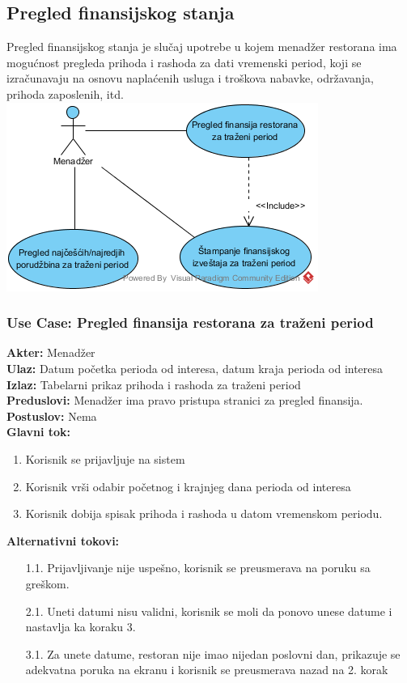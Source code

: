 \documentclass{article}
\begin{document}
\subsection{Pregled finansijskog stanja}
Pregled finansijskog stanja je slučaj upotrebe u kojem menadžer restorana ima mogućnost pregleda prihoda i rashoda za dati vremenski period, koji se izračunavaju na osnovu naplaćenih usluga i troškova nabavke, održavanja, prihoda zaposlenih, itd.
\\
\includegraphics[width=\linewidth]{SU_3_pregled_finansija.png}

\subsubsection{\textbf{Use Case}: Pregled finansija restorana za traženi period}
\textbf{Akter:} Menadžer\\
\textbf{Ulaz:} Datum početka perioda od interesa, datum kraja perioda od interesa\\
\textbf{Izlaz:} Tabelarni prikaz prihoda i rashoda za traženi period\\
\textbf{Preduslovi:} Menadžer ima pravo pristupa stranici za pregled finansija.\\
\textbf{Postuslov:} Nema\\
\textbf{Glavni tok:}
\begin{enumerate}
\item Korisnik se prijavljuje na sistem
\item Korisnik vrši odabir početnog i krajnjeg dana perioda od interesa
\item Korisnik dobija spisak prihoda i rashoda u datom vremenskom periodu.
\end{enumerate}
\textbf{Alternativni tokovi:} \\
\begin{itemize}
\item [1.1.] Prijavljivanje nije uspešno, korisnik se preusmerava na poruku sa greškom.
\item [2.1.] Uneti datumi nisu validni, korisnik se moli da ponovo unese datume i nastavlja ka koraku 3.\\
\item [3.1.] Za unete datume, restoran nije imao nijedan poslovni dan, prikazuje se adekvatna poruka na ekranu i korisnik se preusmerava nazad na 2. korak
\end{itemize}
        
\end{document}
